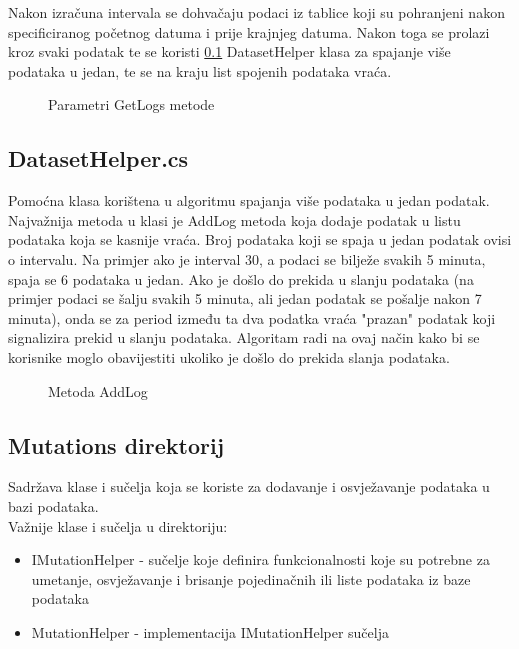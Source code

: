 \documentclass[zavrsnirad]{fer}
\begin{document}
Nakon izračuna intervala se dohvačaju podaci iz tablice koji su pohranjeni nakon specificiranog početnog datuma i prije krajnjeg datuma. Nakon toga se prolazi kroz svaki podatak te se koristi \ref{pog:dataset_helper} DatasetHelper klasa za spajanje više podataka u jedan, te se na kraju list spojenih podataka vraća.

\begin{figure}[htb]
	\centering
	
	\caption{Parametri GetLogs metode}
\end{figure}
\FloatBarrier

\subsection{DatasetHelper.cs}
\label{pog:dataset_helper}
Pomoćna klasa korištena u algoritmu spajanja više podataka u jedan podatak. Najvažnija metoda u klasi je AddLog metoda koja dodaje podatak u listu podataka koja se kasnije vraća. Broj podataka koji se spaja u jedan podatak ovisi o intervalu. Na primjer ako je interval 30, a podaci se bilježe svakih 5 minuta, spaja se 6 podataka u jedan. Ako je došlo do prekida u slanju podataka (na primjer podaci se šalju svakih 5 minuta, ali jedan podatak se pošalje nakon 7 minuta), onda se za period između ta dva podatka vraća "prazan" podatak koji signalizira prekid u slanju podataka. Algoritam radi na ovaj način kako bi se korisnike moglo obavijestiti ukoliko je došlo do prekida slanja podataka.

\begin{figure}[htb]
	\centering
	
	\caption{Metoda AddLog}
\end{figure}
\FloatBarrier

\subsection{Mutations direktorij}
Sadržava klase i sučelja koja se koriste za dodavanje i osvježavanje podataka u bazi podataka.
\\Važnije klase i sučelja u direktoriju:
\begin{itemize}
	\item IMutationHelper - sučelje koje definira funkcionalnosti koje su potrebne za umetanje, osvježavanje i brisanje pojedinačnih ili liste podataka iz baze podataka
	\item MutationHelper - implementacija IMutationHelper sučelja
\end{itemize}
\end{document}
